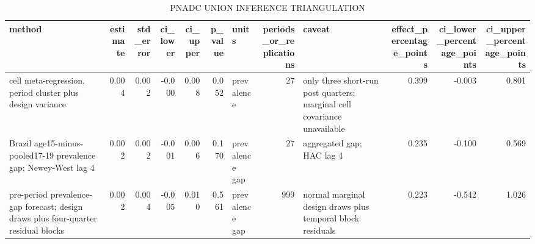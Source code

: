 \begin{table}[!htbp]
\centering
\begingroup\scriptsize
\begin{tabular}{lrrrrrlrlrrr}
  \hline
method & estimate & std\_error & ci\_lower & ci\_upper & p\_value & units & periods\_or\_replications & caveat & effect\_percentage\_points & ci\_lower\_percentage\_points & ci\_upper\_percentage\_points \\ 
  \hline
cell meta-regression, period cluster plus design variance & 0.004 & 0.002 & -0.000 & 0.008 & 0.052 & prevalence &   27 & only three short-run post quarters; marginal cell covariance unavailable & 0.399 & -0.003 & 0.801 \\ 
  Brazil age15-minus-pooled17-19 prevalence gap; Newey-West lag 4 & 0.002 & 0.002 & -0.001 & 0.006 & 0.170 & prevalence gap &   27 & aggregated gap; HAC lag 4 & 0.235 & -0.100 & 0.569 \\ 
  pre-period prevalence-gap forecast; design draws plus four-quarter residual blocks & 0.002 & 0.004 & -0.005 & 0.010 & 0.561 & prevalence gap &  999 & normal marginal design draws plus temporal block residuals & 0.223 & -0.542 & 1.026 \\ 
   \hline
\end{tabular}
\endgroup
\caption{PNADC UNION INFERENCE TRIANGULATION} 
\label{tab:pnadc_union_inference_triangulation}
\end{table}
